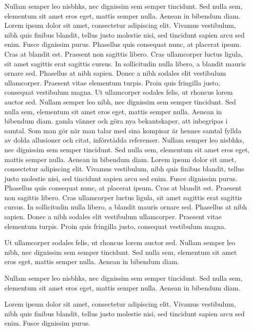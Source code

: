 Nullam semper leo nisbhks, nec dignissim sem semper tincidunt. Sed nulla sem, elementum sit amet eros eget, mattis semper nulla. Aenean in bibendum diam.
Lorem ipsum dolor sit amet, consectetur adipiscing elit. Vivamus vestibulum, nibh quis finibus blandit, tellus justo molestie nisi, sed tincidunt sapien arcu sed enim. Fusce dignissim purus. 
Phasellus quis consequat nunc, at placerat ipsum. Cras at blandit est. Praesent non sagittis libero. Cras ullamcorper luctus ligula, sit amet sagittis erat sagittis cursus. In sollicitudin nulla libero, a blandit mauris ornare sed. Phasellus at nibh sapien. Donec a nibh sodales elit vestibulum ullamcorper. Praesent vitae elementum turpis. Proin quis fringilla justo, consequat vestibulum magna. 
Ut ullamcorper sodales felis, ut rhoncus lorem auctor sed. Nullam semper leo nibh, nec dignissim sem semper tincidunt. Sed nulla sem, elementum sit amet eros eget, mattis semper nulla. Aenean in bibendum diam.
gamla vänner och göra nya bekantskaper, att inbegripas i samtal. Som man gör när man talar med sina kompisar är hennes samtal fyllda av dolda allusioner och citat, införstådda referenser.
Nullam semper leo nisbhks, nec dignissim sem semper tincidunt. Sed nulla sem, elementum sit amet eros eget, mattis semper nulla. Aenean in bibendum diam.
Lorem ipsum dolor sit amet, consectetur adipiscing elit. Vivamus vestibulum, nibh quis finibus blandit, tellus justo molestie nisi, sed tincidunt sapien arcu sed enim. Fusce dignissim purus. 
Phasellus quis consequat nunc, at placerat ipsum. Cras at blandit est. Praesent non sagittis libero. Cras ullamcorper luctus ligula, sit amet sagittis erat sagittis cursus. In sollicitudin nulla libero, a blandit mauris ornare sed. Phasellus at nibh sapien. Donec a nibh sodales elit vestibulum ullamcorper. Praesent vitae elementum turpis. Proin quis fringilla justo, consequat vestibulum magna. 

Ut ullamcorper sodales felis, ut rhoncus lorem auctor sed. Nullam semper leo nibh, nec dignissim sem semper tincidunt. Sed nulla sem, elementum sit amet eros eget, mattis semper nulla. Aenean in bibendum diam.

Nullam semper leo nisbhks, nec dignissim sem semper tincidunt. Sed nulla sem, elementum sit amet eros eget, mattis semper nulla. Aenean in bibendum diam.

Lorem ipsum dolor sit amet, consectetur adipiscing elit. Vivamus vestibulum, nibh quis finibus blandit, tellus justo molestie nisi, sed tincidunt sapien arcu sed enim. Fusce dignissim purus. 

